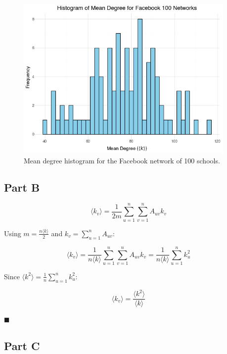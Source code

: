 \documentclass[12pt]{article}
\begin{document}
\begin{figure}[t]
    \centering
    \includegraphics[width=0.95\textwidth]{../figures/mean_degree_histogram.png}
    \caption{Mean degree histogram for the Facebook network of 100 schools.}
    \label{fig:histogram_fb100}
\end{figure}

\subsection*{Part B}

\[
\langle k_v \rangle = \frac{1}{2m}\sum_{u=1}^n \sum_{v=1}^n A_{uv} k_v
\]

Using $m = \frac{n\langle k \rangle}{2}$ and $k_v = \sum_{u=1}^n A_{uv}$:

\[
\langle k_v \rangle = \frac{1}{n\langle k \rangle} \sum_{u=1}^n \sum_{v=1}^n A_{uv} k_v = \frac{1}{n\langle k \rangle} \sum_{u=1}^n k_u^2
\]

Since $\langle k^2 \rangle = \frac{1}{n} \sum_{u=1}^n k_u^2$:

\[
\langle k_v \rangle = \frac{\langle k^2 \rangle}{\langle k \rangle}
\]

\begin{flushright}
\(
\blacksquare
\)
\end{flushright}

\subsection*{Part C}
\end{document}

